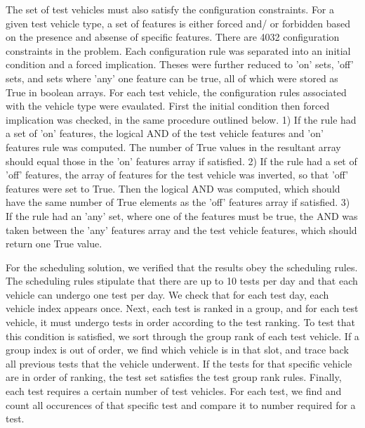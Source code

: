 \documentclass[aps,pra,twocolumn,superscriptaddress,groupedaddress]{revtex4}  %
\begin{document}
The set of test vehicles must also satisfy the configuration constraints. For a
given test vehicle type, a set of features is either forced and/ or forbidden
based on the presence and absense of specific features. There are 4032
configuration constraints in the problem. Each configuration rule was separated
into an initial condition and a forced implication. Theses were further reduced
to 'on' sets, 'off' sets, and sets where 'any' one feature can be true, all of
which were stored as True in boolean arrays. For each test vehicle, the
configuration rules associated with the vehicle type were evaulated. First the 
initial condition then forced implication was checked, in the same procedure
outlined below. 1) If the rule had a set of 'on' features, the logical AND of
the test vehicle features and 'on' features rule was computed. The number of
True values in the resultant array should equal those in the 'on' features array
if satisfied. 2) If the rule had a set of 'off' features, the array of features
for the test vehicle was inverted, so that 'off' features were set to True. Then
the logical AND was computed, which should have the same number of True elements
as the 'off' features array if satisfied. 3) If the rule had an 'any' set, where
one of the features must be true, the AND was taken between the 'any' features
array and the test vehicle features, which should return one True value.

For the scheduling solution, we verified that the results obey the scheduling
rules. The scheduling rules stipulate that there are up to 10 tests per day and
that each vehicle can undergo one test per day. We check that for each test day,
each vehicle index appears once. Next, each test is ranked in a group, and for
each test vehicle, it must undergo tests in order according to the test ranking.
To test that this condition is satisfied, we sort through the group rank of each
test vehicle. If a group index is out of order, we find which vehicle is in that
slot, and trace back all previous tests that the vehicle underwent. If the tests
for that specific vehicle are in order of ranking, the test set satisfies the test
group rank rules. Finally, each test requires a certain number of test vehicles.
For each test, we find and count all occurences of that specific test and compare
it to number required for a test. 
% 
% 
\end{document}
